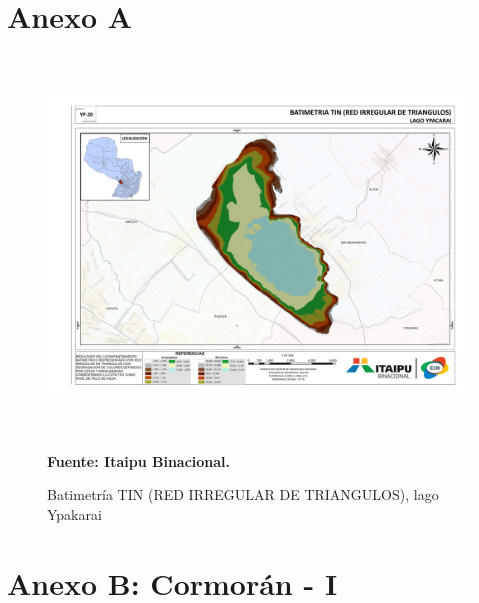 \appendixpageoff
\begin{appendices}




\chapter*{Anexo A}
\label{appendix: a}

\begin{figure}[ht]
    \centering
    \includegraphics[width=150mm, height=100mm]{Imagenes/cap3/Batimetria_lago_Ypacarai_TIN_A3.pdf}
    \caption[BATIMETRIA TIN lago Ypakarai]{Batimetr\'ia TIN (RED IRREGULAR DE TRIANGULOS), lago Ypakarai} \textbf{Fuente:  Itaipu Binacional.}
    \label{fig:BatimetriaItaipu}
\end{figure}

\chapter*{Anexo B: Cormor\'an - I}
\label{appendix: b}


\end{appendices}
